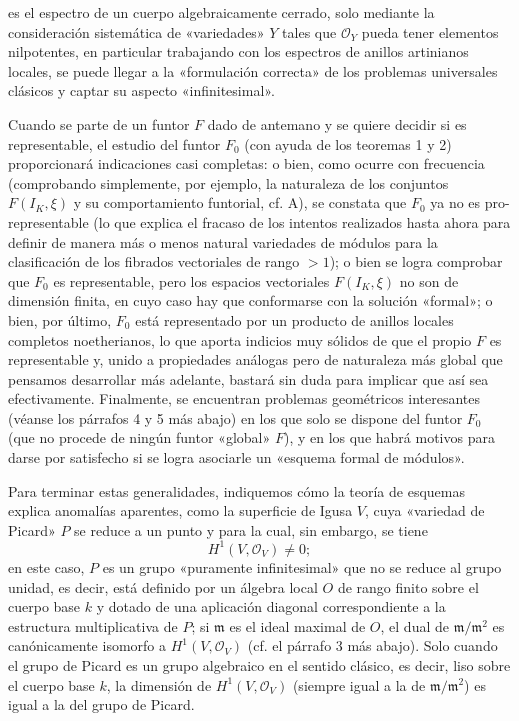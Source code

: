 es el espectro de un cuerpo algebraicamente cerrado, solo mediante la
consideración sistemática de «variedades» $Y$ tales que $\mathcal O_Y$ pueda
tener elementos nilpotentes, en particular trabajando con los espectros de
anillos artinianos locales, se puede llegar a la «formulación correcta» de los
problemas universales clásicos y captar su aspecto «infinitesimal».

Cuando se parte de un funtor $F$ dado de antemano y se quiere decidir si es
representable, el estudio del funtor $F_0$ (con ayuda de los teoremas 1 y 2)
proporcionará indicaciones casi completas: o bien, como ocurre con frecuencia
(comprobando simplemente, por ejemplo, la naturaleza de los conjuntos
$F(I_K,\xi)$ y su comportamiento funtorial, cf. A), se constata que $F_0$ ya no
es pro-representable (lo que explica el fracaso de los intentos realizados
hasta ahora para definir de manera más o menos natural variedades de módulos
para la clasificación de los fibrados vectoriales de rango $>1$); o bien se
logra comprobar que $F_0$ es representable, pero los espacios vectoriales
$F(I_K,\xi)$ no son de dimensión finita, en cuyo caso hay que conformarse con
la solución «formal»; o bien, por último, $F_0$ está representado por un
producto de anillos locales completos noetherianos, lo que aporta indicios muy
sólidos de que el propio $F$ es representable y, unido a propiedades análogas
pero de naturaleza más global que pensamos desarrollar más adelante, bastará
sin duda para implicar que así sea efectivamente. Finalmente, se encuentran
problemas geométricos interesantes (véanse los párrafos 4 y 5 más abajo) en los
que solo se dispone del funtor $F_0$ (que no procede de ningún funtor «global»
$F$), y en los que habrá motivos para darse por satisfecho si se logra asociarle
un «esquema formal de módulos».

Para terminar estas generalidades, indiquemos cómo la teoría de esquemas
explica anomalías aparentes, como la superficie de Igusa $V$, cuya «variedad
de Picard» $P$ se reduce a un punto y para la cual, sin embargo, se tiene
\[
  H^1(V,\mathcal O_V)\ne 0 ;
\]
en este caso, $P$ es un grupo «puramente infinitesimal» que no se reduce al
grupo unidad, es decir, está definido por un álgebra local $O$ de rango finito
sobre el cuerpo base $k$ y dotado de una aplicación diagonal correspondiente a
la estructura multiplicativa de $P$; si $\mathfrak m$ es el ideal maximal de
$O$, el dual de $\mathfrak m/\mathfrak m^2$ es canónicamente isomorfo a
$H^1(V,\mathcal O_V)$ (cf. el párrafo 3 más abajo). Solo cuando el grupo de
Picard es un grupo algebraico en el sentido clásico, es decir, liso sobre el
cuerpo base $k$, la dimensión de $H^1(V,\mathcal O_V)$ (siempre igual a la de
$\mathfrak m/\mathfrak m^2$) es igual a la del grupo de Picard.

